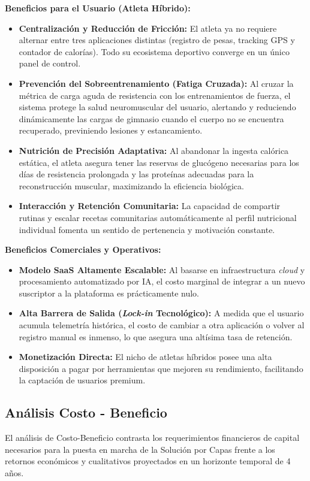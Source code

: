 \documentclass[12pt]{article}
\begin{document}
\textbf{Beneficios para el Usuario (Atleta Híbrido):}
\begin{itemize}
    \item \textbf{Centralización y Reducción de Fricción:} El atleta ya no requiere alternar entre tres aplicaciones distintas (registro de pesas, tracking GPS y contador de calorías). Todo su ecosistema deportivo converge en un único panel de control.
    \item \textbf{Prevención del Sobreentrenamiento (Fatiga Cruzada):} Al cruzar la métrica de carga aguda de resistencia con los entrenamientos de fuerza, el sistema protege la salud neuromuscular del usuario, alertando y reduciendo dinámicamente las cargas de gimnasio cuando el cuerpo no se encuentra recuperado, previniendo lesiones y estancamiento.
    \item \textbf{Nutrición de Precisión Adaptativa:} Al abandonar la ingesta calórica estática, el atleta asegura tener las reservas de glucógeno necesarias para los días de resistencia prolongada y las proteínas adecuadas para la reconstrucción muscular, maximizando la eficiencia biológica.
    \item \textbf{Interacción y Retención Comunitaria:} La capacidad de compartir rutinas y escalar recetas comunitarias automáticamente al perfil nutricional individual fomenta un sentido de pertenencia y motivación constante.
\end{itemize}
\newpage
\textbf{Beneficios Comerciales y Operativos:}
\begin{itemize}
    \item \textbf{Modelo SaaS Altamente Escalable:} Al basarse en infraestructura \textit{cloud} y procesamiento automatizado por IA, el costo marginal de integrar a un nuevo suscriptor a la plataforma es prácticamente nulo.
    \item \textbf{Alta Barrera de Salida (\textit{Lock-in} Tecnológico):} A medida que el usuario acumula telemetría histórica, el costo de cambiar a otra aplicación o volver al registro manual es inmenso, lo que asegura una altísima tasa de retención.
    \item \textbf{Monetización Directa:} El nicho de atletas híbridos posee una alta disposición a pagar por herramientas que mejoren su rendimiento, facilitando la captación de usuarios premium.
\end{itemize}
\newpage
\subsection{Análisis Costo - Beneficio}
El análisis de Costo-Beneficio contrasta los requerimientos financieros de capital necesarios para la puesta en marcha de la Solución por Capas frente a los retornos económicos y cualitativos proyectados en un horizonte temporal de 4 años.
\end{document}
